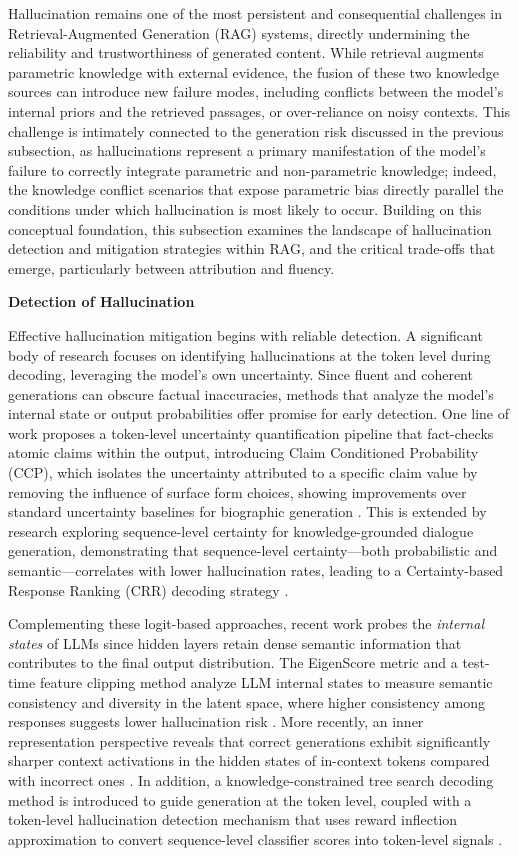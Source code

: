 \documentclass[11pt]{article}
\begin{document}
Hallucination remains one of the most persistent and consequential challenges in Retrieval-Augmented Generation (RAG) systems, directly undermining the reliability and trustworthiness of generated content. While retrieval augments parametric knowledge with external evidence, the fusion of these two knowledge sources can introduce new failure modes, including conflicts between the model's internal priors and the retrieved passages, or over-reliance on noisy contexts. This challenge is intimately connected to the generation risk discussed in the previous subsection, as hallucinations represent a primary manifestation of the model's failure to correctly integrate parametric and non-parametric knowledge; indeed, the knowledge conflict scenarios that expose parametric bias directly parallel the conditions under which hallucination is most likely to occur. Building on this conceptual foundation, this subsection examines the landscape of hallucination detection and mitigation strategies within RAG, and the critical trade-offs that emerge, particularly between attribution and fluency.

\textbf{Detection of Hallucination}

Effective hallucination mitigation begins with reliable detection. A significant body of research focuses on identifying hallucinations at the token level during decoding, leveraging the model's own uncertainty. Since fluent and coherent generations can obscure factual inaccuracies, methods that analyze the model's internal state or output probabilities offer promise for early detection. One line of work proposes a token-level uncertainty quantification pipeline that fact-checks atomic claims within the output, introducing Claim Conditioned Probability (CCP), which isolates the uncertainty attributed to a specific claim value by removing the influence of surface form choices, showing improvements over standard uncertainty baselines for biographic generation \cite{ref140}. This is extended by research exploring sequence-level certainty for knowledge-grounded dialogue generation, demonstrating that sequence-level certainty---both probabilistic and semantic---correlates with lower hallucination rates, leading to a Certainty-based Response Ranking (CRR) decoding strategy \cite{ref141}.

Complementing these logit-based approaches, recent work probes the \emph{internal states} of LLMs since hidden layers retain dense semantic information that contributes to the final output distribution. The EigenScore metric and a test-time feature clipping method analyze LLM internal states to measure semantic consistency and diversity in the latent space, where higher consistency among responses suggests lower hallucination risk \cite{ref134}. More recently, an inner representation perspective reveals that correct generations exhibit significantly sharper context activations in the hidden states of in-context tokens compared with incorrect ones \cite{ref142}. In addition, a knowledge-constrained tree search decoding method is introduced to guide generation at the token level, coupled with a token-level hallucination detection mechanism that uses reward inflection approximation to convert sequence-level classifier scores into token-level signals \cite{ref143}.
\end{document}
